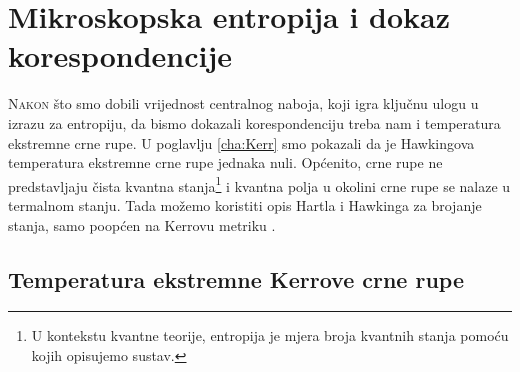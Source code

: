 \chapter{Mikroskopska entropija i dokaz korespondencije}\label{cha:Mikro}

\lettrine[lines=4]{N} {akon} što smo dobili vrijednost centralnog naboja, koji igra ključnu ulogu u izrazu za entropiju, da bismo dokazali korespondenciju treba nam i temperatura ekstremne crne rupe. U poglavlju \ref{cha:Kerr} smo pokazali da je Hawkingova temperatura ekstremne crne rupe jednaka nuli.
\noindent Općenito, crne rupe ne predstavljaju čista kvantna stanja\footnote{U kontekstu kvantne teorije, entropija je mjera broja kvantnih stanja pomoću kojih opisujemo sustav.} i kvantna polja u okolini crne rupe se nalaze u termalnom stanju. Tada možemo koristiti opis Hartla i Hawkinga za brojanje stanja, samo poopćen na Kerrovu metriku \citep{Bredberg:2011hp, wald2010general}.

\newpage

\section{Temperatura ekstremne Kerrove crne rupe}\label{sec:Temperatura}






